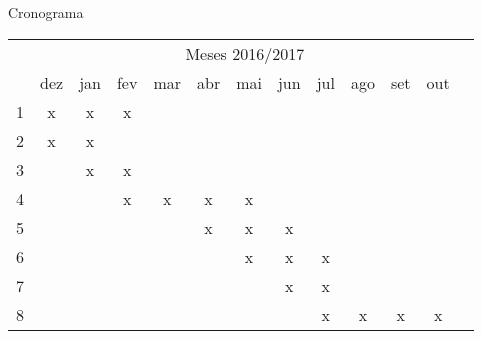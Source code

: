 \begin{frame}{Cronograma}
\begin{table}[!htpb]
\centering
\begin{small} 
  
\setlength{\tabcolsep}{5pt} 

\begin{tabular}{|c|c|c|c|c|c|c|c|c|c|c|c|c|}\hline
 & \multicolumn{11}{c|}{Meses 2016/2017}\\ \cline{2-12}
\raisebox{1.5ex}{Atividade} & dez & jan & fev & mar & abr & mai & jun & jul & ago & set & out \\ \hline

1 & x & x & x &   &   &   &   &   &   &   &   \\ \hline
2 & x & x &   &   &   &   &   &   &   &   &   \\ \hline
3 &   & x & x &   &   &   &   &   &   &   &   \\ \hline
4 &   &   & x & x & x & x &   &   &   &   &   \\ \hline
5 &   &   &   &   & x & x & x &   &   &   &   \\ \hline
6 &   &   &   &   &   & x & x & x &   &   &   \\ \hline
7 &   &   &   &   &   &   & x & x &   &   &   \\ \hline
8 &   &   &   &   &   &   &   & x & x & x & x \\ \hline

\end{tabular} 
\end{small}
\end{table}
\end{frame}